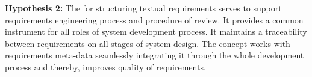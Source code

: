 \textbf{Hypothesis 2:} The \cbc for structuring textual requirements serves to support requirements engineering process and procedure of review. It provides a common instrument for all roles of system development process. It maintains a traceability between requirements on all stages of system design. The concept works with requirements meta-data seamlessly integrating it through the whole development process and thereby, improves quality of requirements.

%
%
%
%
%
%
%

